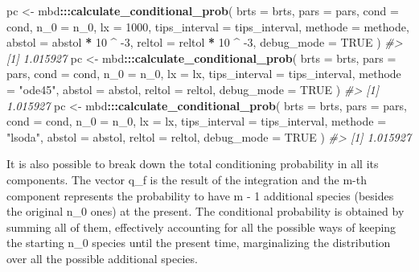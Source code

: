 \documentclass[]{article}
\newenvironment{Shaded}{\begin{snugshade}}{\end{snugshade}}
\newcommand{\CommentTok}[1]{\textcolor[rgb]{0.56,0.35,0.01}{\textit{#1}}}
\newcommand{\DataTypeTok}[1]{\textcolor[rgb]{0.13,0.29,0.53}{#1}}
\newcommand{\DecValTok}[1]{\textcolor[rgb]{0.00,0.00,0.81}{#1}}
\newcommand{\KeywordTok}[1]{\textcolor[rgb]{0.13,0.29,0.53}{\textbf{#1}}}
\newcommand{\NormalTok}[1]{#1}
\newcommand{\OperatorTok}[1]{\textcolor[rgb]{0.81,0.36,0.00}{\textbf{#1}}}
\newcommand{\OtherTok}[1]{\textcolor[rgb]{0.56,0.35,0.01}{#1}}
\newcommand{\StringTok}[1]{\textcolor[rgb]{0.31,0.60,0.02}{#1}}
\begin{document}
\begin{Shaded}
\begin{Highlighting}[]
\NormalTok{pc <-}\StringTok{ }\NormalTok{mbd}\OperatorTok{:::}\KeywordTok{calculate_conditional_prob}\NormalTok{(}
  \DataTypeTok{brts =}\NormalTok{ brts,}
  \DataTypeTok{pars =}\NormalTok{ pars,}
  \DataTypeTok{cond =}\NormalTok{ cond,}
  \DataTypeTok{n_0 =}\NormalTok{ n_}\DecValTok{0}\NormalTok{,}
  \DataTypeTok{lx =} \DecValTok{1000}\NormalTok{,}
  \DataTypeTok{tips_interval =}\NormalTok{ tips_interval,}
  \DataTypeTok{methode =}\NormalTok{ methode,}
  \DataTypeTok{abstol =}\NormalTok{ abstol }\OperatorTok{*}\StringTok{ }\DecValTok{10} \OperatorTok{^}\StringTok{ }\DecValTok{-3}\NormalTok{,}
  \DataTypeTok{reltol =}\NormalTok{ reltol }\OperatorTok{*}\StringTok{ }\DecValTok{10} \OperatorTok{^}\StringTok{ }\DecValTok{-3}\NormalTok{,}
  \DataTypeTok{debug_mode =} \OtherTok{TRUE}
\NormalTok{)}
\CommentTok{#> [1] 1.015927}
\NormalTok{pc <-}\StringTok{ }\NormalTok{mbd}\OperatorTok{:::}\KeywordTok{calculate_conditional_prob}\NormalTok{(}
  \DataTypeTok{brts =}\NormalTok{ brts,}
  \DataTypeTok{pars =}\NormalTok{ pars,}
  \DataTypeTok{cond =}\NormalTok{ cond,}
  \DataTypeTok{n_0 =}\NormalTok{ n_}\DecValTok{0}\NormalTok{,}
  \DataTypeTok{lx =}\NormalTok{ lx,}
  \DataTypeTok{tips_interval =}\NormalTok{ tips_interval,}
  \DataTypeTok{methode =} \StringTok{"ode45"}\NormalTok{,}
  \DataTypeTok{abstol =}\NormalTok{ abstol,}
  \DataTypeTok{reltol =}\NormalTok{ reltol,}
  \DataTypeTok{debug_mode =} \OtherTok{TRUE}
\NormalTok{)}
\CommentTok{#> [1] 1.015927}
\NormalTok{pc <-}\StringTok{ }\NormalTok{mbd}\OperatorTok{:::}\KeywordTok{calculate_conditional_prob}\NormalTok{(}
  \DataTypeTok{brts =}\NormalTok{ brts,}
  \DataTypeTok{pars =}\NormalTok{ pars,}
  \DataTypeTok{cond =}\NormalTok{ cond,}
  \DataTypeTok{n_0 =}\NormalTok{ n_}\DecValTok{0}\NormalTok{,}
  \DataTypeTok{lx =}\NormalTok{ lx,}
  \DataTypeTok{tips_interval =}\NormalTok{ tips_interval,}
  \DataTypeTok{methode =} \StringTok{"lsoda"}\NormalTok{,}
  \DataTypeTok{abstol =}\NormalTok{ abstol,}
  \DataTypeTok{reltol =}\NormalTok{ reltol,}
  \DataTypeTok{debug_mode =} \OtherTok{TRUE}
\NormalTok{)}
\CommentTok{#> [1] 1.015927}
\end{Highlighting}
\end{Shaded}

It is also possible to break down the total conditioning probability in all its
components. The vector q\_f is the result of the integration and the m-th
component represents the probability to have m - 1 additional species (besides
the original n\_0 ones) at the present. The conditional probability is obtained
by summing all of them, effectively accounting for all the possible ways of
keeping the starting n\_0 species until the present time, marginalizing the
distribution over all the possible additional species.
\end{document}
